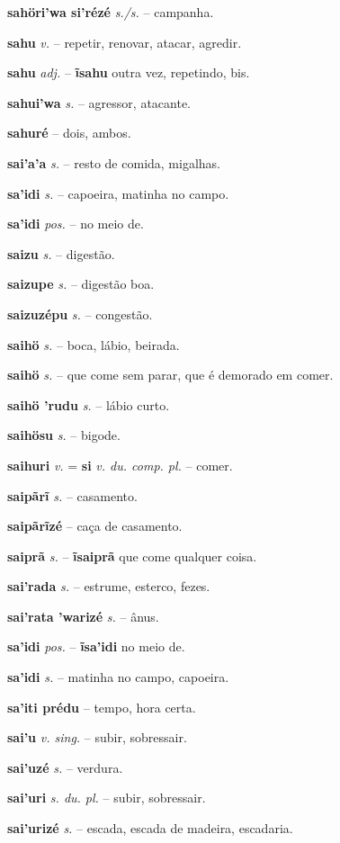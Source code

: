 \textbf{sahöri'wa si'rézé} \textit{s./s.} -- campanha.

\textbf{sahu} \textit{v.} -- repetir, renovar, atacar, agredir.

\textbf{sahu} \textit{adj.} -- \textbf{ĩsahu} outra vez, repetindo, bis.

\textbf{sahui'wa} \textit{s.} -- agressor, atacante.

\textbf{sahuré} -- dois, ambos.

\textbf{sai'a'a} \textit{s.} -- resto de comida, migalhas.

\textbf{sa'idi} \textit{s.} -- capoeira, matinha no campo.

\textbf{sa'idi} \textit{pos.} -- no meio de.

\textbf{saizu} \textit{s.} -- digestão.

\textbf{saizupe} \textit{s.} -- digestão boa.

\textbf{saizuzépu} \textit{s.} -- congestão.

\textbf{saihö} \textit{s.} -- boca, lábio, beirada.

\textbf{saihö} \textit{s.} -- que come sem parar, que é demorado em comer.

\textbf{saihö 'rudu} \textit{s.} -- lábio curto.

\textbf{saihösu} \textit{s.} -- bigode.

\textbf{saihuri} \textit{v.} = \textbf{si} \textit{v. du. comp. pl.} -- comer.

\textbf{saipãrĩ} \textit{s.} -- casamento.

\textbf{saipãrĩzé} \textit{} -- caça de casamento.

\textbf{saiprã} \textit{s.} -- \textbf{ĩsaiprã} que come qualquer coisa.

\textbf{sai'rada} \textit{s.} -- estrume, esterco, fezes.

\textbf{sai'rata 'warizé} \textit{s.} -- ânus.

\textbf{sa'idi} \textit{pos.} -- \textbf{ĩsa'idi} no meio de.

\textbf{sa'idi} \textit{s.} -- matinha no campo, capoeira.

\textbf{sa'iti prédu} \textit{} -- tempo, hora certa.

\textbf{sai'u} \textit{v. sing.} -- subir, sobressair.

\textbf{sai'uzé} \textit{s.} -- verdura.

\textbf{sai'uri} \textit{s. du. pl.} -- subir, sobressair.

\textbf{sai'urizé} \textit{s.} -- escada, escada de madeira, escadaria.

